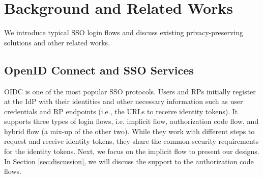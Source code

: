 \section{Background and Related Works}
\label{sec:background}

We introduce %
typical SSO login flows and discuss existing privacy-preserving solutions and other related works.

\subsection{OpenID Connect and SSO Services}
\label{subsec:OIDC}
OIDC is one of the most popular SSO protocols. %
Users and RPs initially register at the IdP with their identities %
and other necessary information such as user credentials %
and RP endpoints (i.e., the URLs to receive identity tokens).
It supports three types of login flows, i.e. implicit flow, authorization code flow, and hybrid flow (a mix-up of the other two).
While they work with different steps to request and receive identity tokens, they share the common security requirements for the identity tokens. Next, we focus on the implicit flow to present our designs. In Section \ref{sec:discussion}, we will discuss the support to the authorization code flows.

